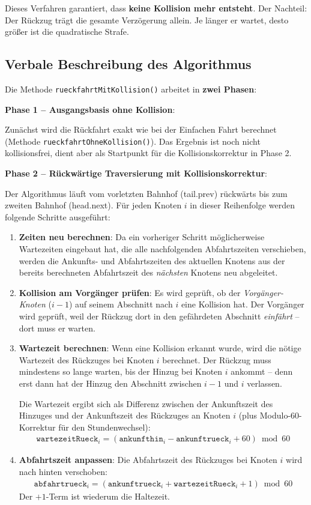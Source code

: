 \documentclass[12pt,a4paper]{article}
\begin{document}
Dieses Verfahren garantiert, dass \textbf{keine Kollision mehr entsteht}. Der Nachteil: Der Rückzug trägt die gesamte Verzögerung allein. Je länger er wartet, desto größer ist die quadratische Strafe.

\subsection{Verbale Beschreibung des Algorithmus}

Die Methode \texttt{rueckfahrtMitKollision()} arbeitet in \textbf{zwei Phasen}:

\textbf{Phase 1 -- Ausgangsbasis ohne Kollision}:

Zunächst wird die Rückfahrt exakt wie bei der Einfachen Fahrt berechnet (Methode \texttt{rueckfahrtOhneKollision()}). Das Ergebnis ist noch nicht kollisionsfrei, dient aber als Startpunkt für die Kollisionskorrektur in Phase 2.

\textbf{Phase 2 -- Rückwärtige Traversierung mit Kollisionskorrektur}:

Der Algorithmus läuft vom vorletzten Bahnhof (tail.prev) rückwärts bis zum zweiten Bahnhof (head.next). Für jeden Knoten $i$ in dieser Reihenfolge werden folgende Schritte ausgeführt:

\begin{enumerate}
    \item \textbf{Zeiten neu berechnen}: Da ein vorheriger Schritt möglicherweise Wartezeiten eingebaut hat, die alle nachfolgenden Abfahrtszeiten verschieben, werden die Ankunfts- und Abfahrtszeiten des aktuellen Knotens aus der bereits berechneten Abfahrtszeit des \emph{nächsten} Knotens neu abgeleitet.
    \item \textbf{Kollision am Vorgänger prüfen}: Es wird geprüft, ob der \emph{Vorgänger-Knoten} ($i-1$) auf seinem Abschnitt nach $i$ eine Kollision hat. Der Vorgänger wird geprüft, weil der Rückzug dort in den gefährdeten Abschnitt \emph{einfährt} -- dort muss er warten.
    \item \textbf{Wartezeit berechnen}: Wenn eine Kollision erkannt wurde, wird die nötige Wartezeit des Rückzuges bei Knoten $i$ berechnet. Der Rückzug muss mindestens so lange warten, bis der Hinzug bei Knoten $i$ ankommt -- denn erst dann hat der Hinzug den Abschnitt zwischen $i-1$ und $i$ verlassen.

    Die Wartezeit ergibt sich als Differenz zwischen der Ankunftszeit des Hinzuges und der Ankunftszeit des Rückzuges an Knoten $i$ (plus Modulo-60-Korrektur für den Stundenwechsel):
    \begin{align*}
        \texttt{wartezeitRueck}_i = (\texttt{ankunfthin}_i - \texttt{ankunftrueck}_i + 60) \bmod 60
    \end{align*}

    \item \textbf{Abfahrtszeit anpassen}: Die Abfahrtszeit des Rückzuges bei Knoten $i$ wird nach hinten verschoben:
    \begin{align*}
        \texttt{abfahrtrueck}_i = (\texttt{ankunftrueck}_i + \texttt{wartezeitRueck}_i + 1) \bmod 60
    \end{align*}
    Der $+1$-Term ist wiederum die Haltezeit.
\end{enumerate}
\end{document}
